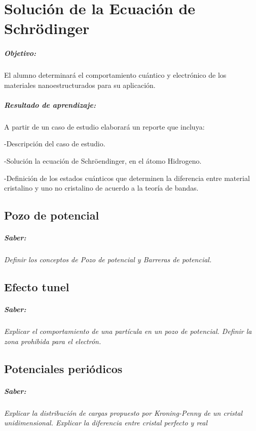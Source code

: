 \chapter{ Solución de la Ecuación de Schrödinger }
\paragraph{Objetivo: }
El alumno determinará el comportamiento cuántico y electrónico de los materiales nanoestructurados para su aplicación.

\paragraph{Resultado de aprendizaje: }
A partir de un caso de estudio elaborará un reporte que incluya:

-Descripción del caso de estudio.

-Solución la ecuación de Schröendinger, en el átomo Hidrogeno.

-Definición de los estados cuánticos que determinen la diferencia entre material cristalino y uno no cristalino de acuerdo a
la teoría de bandas.
 

\section{Pozo de potencial
}
\paragraph{Saber: }
\textit{Definir los conceptos de Pozo de potencial y Barreras de potencial. }

\section{Efecto tunel}
\paragraph{Saber: }
\textit{Explicar el comportamiento 	de una partícula en un pozo de potencial. Definir la zona prohibida para el electrón.}

\section{Potenciales periódicos}
\paragraph{Saber: }
\textit{Explicar la distribución de	cargas propuesto por Kroning-Penny de un cristal unidimensional. Explicar la diferencia entre cristal perfecto y real}

